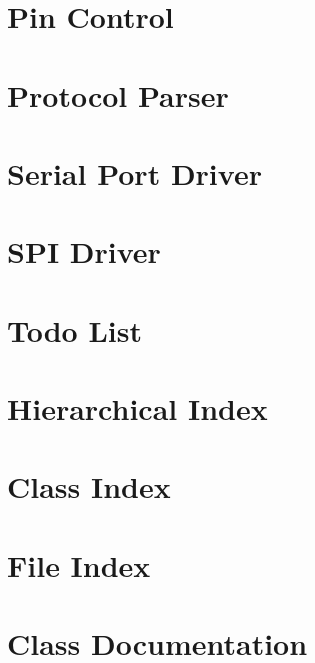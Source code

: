 \documentclass[twoside]{book}
\newcommand{\+}{\discretionary{\mbox{\scriptsize$\hookleftarrow$}}{}{}}
\begin{document}
\chapter{Pin Control}
\label{md_lib_pin_control__r_e_a_d_m_e}

\chapter{Protocol Parser}
\label{md_lib_protocol_parser__r_e_a_d_m_e}

\chapter{Serial Port Driver}
\label{md_lib_serial_port_driver__r_e_a_d_m_e}

\chapter{SPI Driver}
\label{md_lib_spi_driver__r_e_a_d_m_e}

\chapter{Todo List}
\label{todo}

\chapter{Hierarchical Index}

\chapter{Class Index}

\chapter{File Index}

\chapter{Class Documentation}




























\end{document}
